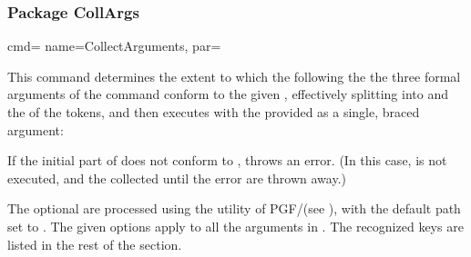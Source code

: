 \documentclass[a4paper,11pt]{article}
\begin{document}
\endgroup %
\endgroup



\subsubsection{Package CollArgs}
\label{sec:ref:collargs}

\begingroup
{}

\begin{doc}{cmd={
      name=CollectArguments,
      par=%
      \textcolor{gray}{}}}
  
  This command determines the extent to which the  following the
  the three formal arguments of the command conform to the given , effectively splitting  into  and the  of the tokens, and then executes
   with the  provided as a single, braced
  argument:
  \begin{center}
    \textcolor{gray}{}
  \end{center}
  If the initial part of  does not conform to ,  throws an error.  (In this case,
   is not executed, and the  collected until the
  error are thrown away.)

  The optional  are processed using the  utility of
  PGF/\TikZ (see ), with the default path set to
  .  The given options apply to all the arguments in
  .  The recognized keys are listed in the rest of
  the section.
  

\end{doc}
\end{document}
